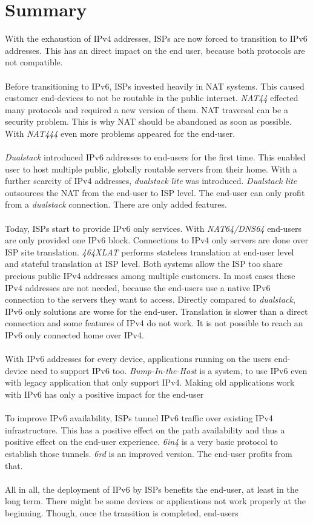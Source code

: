 \documentclass[format=sigconf, natbib=true, nonacm=true]{acmart}
\begin{document}
    \section{Summary}
    With the exhaustion of IPv4 addresses, ISPs are now forced to transition to IPv6 addresses. This has an direct impact on the end user, because both protocols are not compatible.\\\\Before transitioning to IPv6, ISPs invested heavily in NAT systems. This caused customer end-devices to not be routable in the public internet. \textit{NAT44} effected many protocols and required a new version of them. NAT traversal can be a security problem. This is why NAT should be abandoned as soon as possible. With \textit{NAT444} even more problems appeared for the end-user.\\\\\textit{Dualstack} introduced IPv6 addresses to end-users for the first time. This enabled user to host multiple public, globally routable servers from their home. With a further scarcity of IPv4 addresses, \textit{dualstack lite} was introduced. \textit{Dualstack lite} outsources the NAT from the end-user to ISP level. The end-user can only profit from a \textit{dualstack} connection. There are only added features.\\\\Today, ISPs start to provide IPv6 only services. With \textit{NAT64/DNS64} end-users are only provided one IPv6 block. Connections to IPv4 only servers are done over ISP site translation. \textit{464XLAT} performs stateless translation at end-user level and stateful translation at ISP level. Both systems allow the ISP too share precious public IPv4 addresses among multiple customers. In most cases these IPv4 addresses are not needed, because the end-users use a native IPv6 connection to the servers they want to access. Directly compared to \textit{dualstack}, IPv6 only solutions are worse for the end-user. Translation is slower than a direct connection and some features of IPv4 do not work. It is not possible to reach an IPv6 only connected home over IPv4.\\\\With IPv6 addresses for every device, applications running on the users end-device need to support IPv6 too. \textit{Bump-In-the-Host} is a system, to use IPv6 even with legacy application that only support IPv4. Making old applications work with IPv6 has only a positive impact for the end-user\\\\To improve IPv6 availability, ISPs tunnel IPv6 traffic over existing IPv4 infrastructure. This has a positive effect on the path availability and thus a positive effect on the end-user experience. \textit{6in4} is a very basic protocol to establish those tunnels. \textit{6rd} is an improved version. The end-user profits from that.\\\\All in all, the deployment of IPv6 by ISPs benefits the end-user, at least in the long term. There might be some devices or applications not work properly at the beginning. Though, once the transition is completed, end-users 
\end{document}
